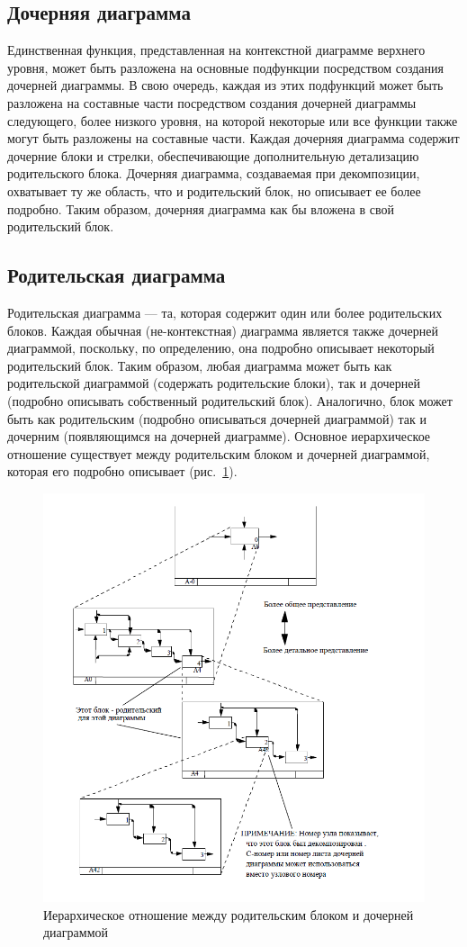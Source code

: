\documentclass[a4paper, final]{article}
\begin{document}
\subsection{Дочерняя диаграмма}
Единственная функция, представленная на контекстной диаграмме верхнего уровня, может быть разложена на основные подфункции посредством создания дочерней диаграммы. В свою очередь, каждая из этих подфункций может быть разложена на составные части посредством создания дочерней диаграммы следующего, более низкого уровня, на которой некоторые или все функции также могут быть разложены на составные части. Каждая дочерняя диаграмма содержит дочерние блоки и стрелки, обеспечивающие дополнительную детализацию родительского блока. Дочерняя диаграмма, создаваемая при декомпозиции, охватывает ту же область, что и родительский блок, но описывает ее более подробно. Таким образом, дочерняя диаграмма как бы вложена в свой родительский блок. 

\subsection{Родительская диаграмма}
Родительская диаграмма --- та, которая содержит один или более родительских блоков. Каждая обычная (не-контекстная) диаграмма является также
дочерней диаграммой, поскольку, по определению, она подробно описывает некоторый родительский блок. Таким образом, любая диаграмма может быть как родительской диаграммой (содержать родительские блоки), так и дочерней (подробно описывать собственный родительский блок). Аналогично, блок может быть как родительским (подробно описываться дочерней диаграммой) так и дочерним (появляющимся на дочерней диаграмме). Основное иерархическое отношение существует между родительским блоком и дочерней диаграммой, которая его подробно описывает (рис.~\ref{img:struct}).

\begin{figure}[H]
   \centering
   \includegraphics[width=0.5\linewidth]{struct.png}
   \caption{Иерархическое отношение между родительским блоком и дочерней диаграммой}
   \label{img:struct}
\end{figure}
\end{document}
